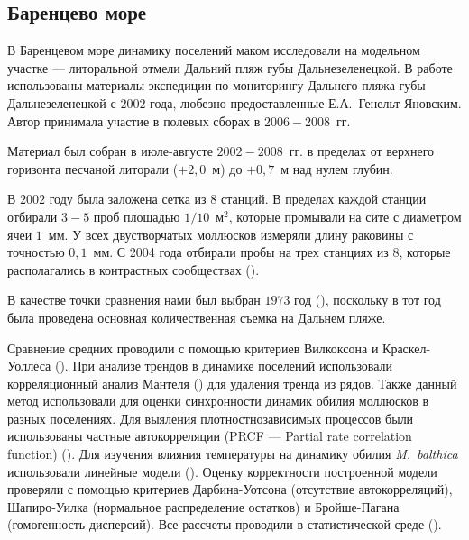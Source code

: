 \afterpage{\clearpage}

        \subsection{Баренцево море}

В Баренцевом море динамику поселений маком исследовали на модельном участке --- литоральной отмели Дальний пляж губы Дальнезеленецкой. 
В работе использованы материалы экспедиции по мониторингу Дальнего пляжа губы Дальнезеленецкой с $2002$ года, любезно предоставленные Е.\:А.~Генельт-Яновским.
Автор принимала участие в полевых сборах в $2006 - 2008$~гг.

Материал был собран в июле-августе $2002 - 2008$~гг. в пределах от верхнего горизонта песчаной литорали ($+2,0$~м) до $+0,7$~м над нулем глубин. 

 В $2002$ году была заложена сетка из $8$ станций. 
 В пределах каждой станции отбирали $3 - 5$ проб площадью $1/10$~м$^2$, которые промывали на сите с диаметром ячеи $1$~мм. 
 У всех двустворчатых моллюсков измеряли длину раковины с точностью $0,1$~мм. 
 С 2004 года отбирали пробы на трех станциях из $8$, которые располагались в контрастных сообществах (\cite{Genelt_Dalnezeleneckaya_2008}). 

В качестве точки сравнения нами был выбран $1973$ год (\cite{Streltsov_et_al_1974, Agarova_et_al_1976}), поскольку в тот год была проведена основная количественная съемка на Дальнем пляже. 


Сравнение средних проводили с помощью критериев Вилкоксона и Краскел-Уоллеса (\cite{Hollander_et_al_2013}).
При анализе трендов в динамике поселений использовали корреляционный анализ Мантеля (\cite{Legendre_Legendre_2012}) для удаления тренда из рядов. 
Также данный метод использовали для оценки синхронности динамик обилия моллюсков в разных поселениях.
Для выяления плотностнозависимых процессов были использованы частные автокорреляции (PRCF --- Partial rate correlation function) (\cite{Berryman_Turchin_2001}).
Для изучения влияния температуры на динамику обилия \textit{M.~balthica} использовали линейные модели (\cite{Chambers_Hastie_1991}).
Оценку корректности построенной модели проверяли с помощью критериев Дарбина-Уотсона (отсутствие автокорреляций), Шапиро-Уилка (нормальное распределение остатков) и Бройше-Пагана (гомогенность дисперсий).
Все рассчеты проводили в статистической среде \R{} (\cite{R_2014}).

